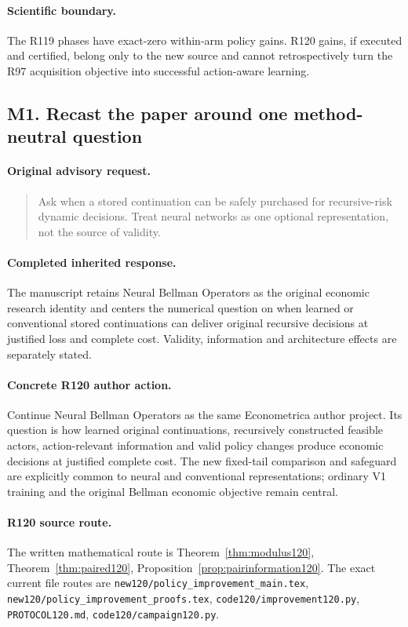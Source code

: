\paragraph{Scientific boundary.}
The R119 phases have exact-zero within-arm policy gains. R120 gains, if executed and certified, belong only to the new source and cannot retrospectively turn the R97 acquisition objective into successful action-aware learning.

\subsection{M1. Recast the paper around one method-neutral question}
\label{response120:M1}
\paragraph{Original advisory request.}
\begin{quote}
Ask when a stored continuation can be safely purchased for recursive-risk dynamic decisions. Treat neural networks as one optional representation, not the source of validity.
\end{quote}
\paragraph{Completed inherited response.}
The manuscript retains Neural Bellman Operators as the original economic research identity and centers the numerical question on when learned or conventional stored continuations can deliver original recursive decisions at justified loss and complete cost. Validity, information and architecture effects are separately stated.
\paragraph{Concrete R120 author action.}
Continue Neural Bellman Operators as the same Econometrica author project. Its question is how learned original continuations, recursively constructed feasible actors, action-relevant information and valid policy changes produce economic decisions at justified complete cost. The new fixed-tail comparison and safeguard are explicitly common to neural and conventional representations; ordinary V1 training and the original Bellman economic objective remain central.
\paragraph{R120 source route.}
The written mathematical route is Theorem~\ref{thm:modulus120}, Theorem~\ref{thm:paired120}, Proposition~\ref{prop:pairinformation120}. The exact current file routes are \nolinkurl{new120/policy_improvement_main.tex}, \nolinkurl{new120/policy_improvement_proofs.tex}, \nolinkurl{code120/improvement120.py}, \nolinkurl{PROTOCOL120.md}, \nolinkurl{code120/campaign120.py}.

